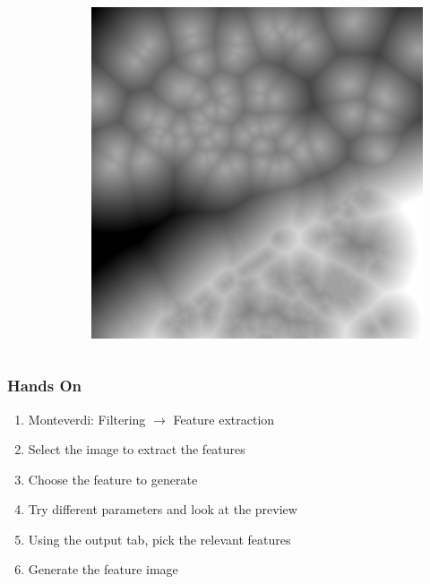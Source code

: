 \documentclass[compress]{beamer}
\begin{document}
\begin{frame}
\begin{columns}
\begin{column}{0.32\textwidth}
\begin{figure}[]
\end{figure}
\end{column}
\begin{column}{0.32\textwidth}
\begin{figure}[]
  \includegraphics[width=1.0\textwidth]{DistanceFromWater.jpg}
\end{figure}
\end{column}
\end{columns}
\end{frame}


\begin{frame}
\frametitle{Hands On}
\begin{enumerate}
\item Monteverdi: Filtering $\rightarrow$ Feature extraction
\item Select the image to extract the features
\item Choose the feature to generate
\item Try different parameters and look at the preview
\item Using the output tab, pick the relevant features
\item Generate the feature image
\end{enumerate}

\end{frame}
\end{document}
